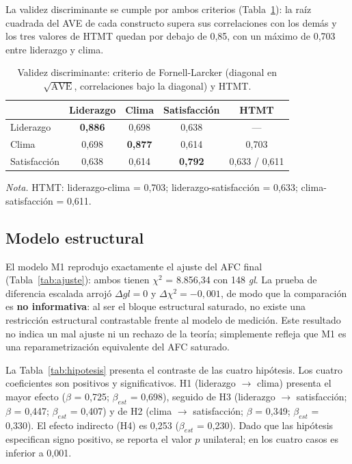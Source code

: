 \documentclass[11pt,a4paper]{article}
\newcommand{\chisq}{$\chi^2$}
\newcommand{\df}{\textit{gl}}
\begin{document}
La validez discriminante se cumple por ambos criterios (Tabla~\ref{tab:discriminante}): la
raíz cuadrada del AVE de cada constructo supera sus correlaciones con los demás y los tres
valores de HTMT quedan por debajo de 0,85, con un máximo de 0,703 entre liderazgo y clima.

\begin{table}[htbp]
\centering
\caption{Validez discriminante: criterio de Fornell-Larcker (diagonal en $\sqrt{\mathrm{AVE}}$,
correlaciones bajo la diagonal) y HTMT.}
\label{tab:discriminante}
\small
\begin{tabular}{@{}lcccc@{}}
\toprule
 & Liderazgo & Clima & Satisfacción & HTMT \\
\midrule
Liderazgo & \textbf{0,886} & 0,698 & 0,638 & --- \\
Clima & 0,698 & \textbf{0,877} & 0,614 & 0,703 \\
Satisfacción & 0,638 & 0,614 & \textbf{0,792} & 0,633 / 0,611 \\
\bottomrule
\end{tabular}

\vspace{2pt}
\parbox{0.9\textwidth}{\footnotesize \textit{Nota.} HTMT: liderazgo-clima = 0,703;
liderazgo-satisfacción = 0,633; clima-satisfacción = 0,611.}
\end{table}

\subsection{Modelo estructural}

El modelo M1 reprodujo exactamente el ajuste del AFC final (Tabla~\ref{tab:ajuste}): ambos
tienen \chisq{} = 8.856,34 con 148 \df. La prueba de diferencia escalada arrojó
$\Delta\df = 0$ y $\Delta\chi^2 = -0,001$, de modo que la comparación es
\textbf{no informativa}: al ser el bloque estructural saturado, no existe una restricción
estructural contrastable frente al modelo de medición. Este resultado no indica un mal
ajuste ni un rechazo de la teoría; simplemente refleja que M1 es una reparametrización
equivalente del AFC saturado.

La Tabla~\ref{tab:hipotesis} presenta el contraste de las cuatro hipótesis. Los cuatro
coeficientes son positivos y significativos. H1 (liderazgo $\rightarrow$ clima) presenta el
mayor efecto ($\beta$ = 0,725; $\beta_{est}$ = 0,698), seguido de H3 (liderazgo
$\rightarrow$ satisfacción; $\beta$ = 0,447; $\beta_{est}$ = 0,407) y de H2 (clima
$\rightarrow$ satisfacción; $\beta$ = 0,349; $\beta_{est}$ = 0,330). El efecto indirecto
(H4) es 0,253 ($\beta_{est}$ = 0,230). Dado que las hipótesis especifican signo positivo, se
reporta el valor $p$ unilateral; en los cuatro casos es inferior a 0,001.
\end{document}

